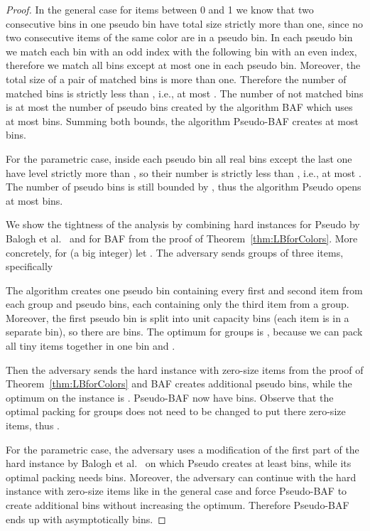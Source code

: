 \documentclass[11pt,a4paper]{article}
\begin{document}
\begin{proof}
In the general case for items between 0 and 1 we know that two
consecutive bins in one pseudo bin have total size strictly more than one,
since no two consecutive items of the same color are in a pseudo bin.
In each pseudo bin we match each bin with an odd index with the following bin
with an even index, therefore we match all bins except at most one in each pseudo bin.
Moreover, the total size of a pair of matched bins is more than one.
Therefore the number of matched bins is strictly less than ,
i.e., at most .
The number of not matched bins is at most the number of pseudo bins
created by the algorithm BAF which uses at most
 bins.
Summing both bounds, the algorithm Pseudo-BAF creates at most  bins.

For the parametric case, inside each pseudo bin all real bins except the last one
have level strictly more than , so their number is strictly less than ,
i.e., at most .  
The number of pseudo bins is still bounded by ,
thus the algorithm Pseudo opens at most  bins.

We show the tightness of the analysis by combining hard instances
for Pseudo by Balogh et al.~\cite{balogh14}
and for BAF from the proof of Theorem~\ref{thm:LBforColors}.
More concretely, for  (a big integer) let .
The adversary sends  groups of three items, specifically


The algorithm creates one pseudo bin containing every first and second item from each group and  pseudo bins,
each containing only the third item from a group.
Moreover, the first pseudo bin is split into  unit capacity bins (each item is in a separate bin), so there are  bins.
The optimum for  groups is , because we can pack all tiny items together in one bin and .

Then the adversary sends the hard instance with zero-size items from the proof of Theorem~\ref{thm:LBforColors}
and BAF creates additional  pseudo bins,
while the optimum on the instance is . Pseudo-BAF now have  bins.
Observe that the optimal packing for  groups does not need to be changed to put there zero-size items, thus .

For the parametric case, the adversary uses a modification of the first part of the hard
instance by Balogh et al.~\cite{balogh14} on which Pseudo creates at least  bins,
while its optimal packing needs  bins.
Moreover, the adversary can continue with the hard instance with zero-size items
like in the general case and force Pseudo-BAF to create additional  bins
without increasing the optimum. Therefore
Pseudo-BAF ends up with asymptotically  bins.
\end{proof}
\end{document}
